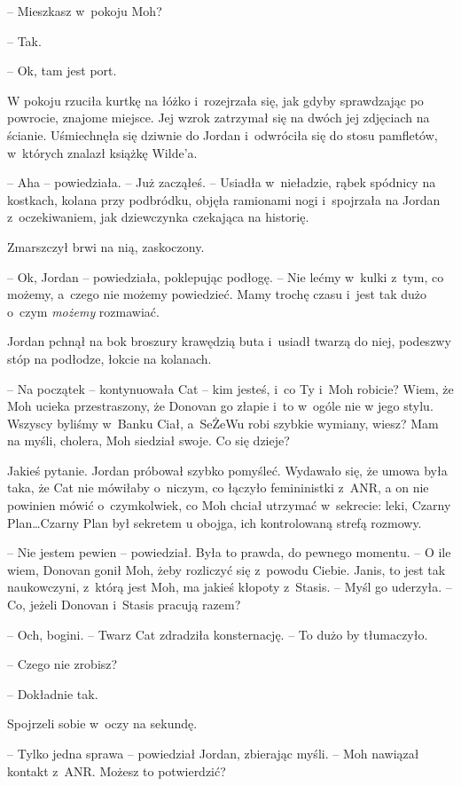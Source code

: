 \documentclass[oneside,polish,11pt,sfheadings]{mwbk}
\begin{document}
-- Mieszkasz w~pokoju Moh?

-- Tak.

-- Ok, tam jest port.

W pokoju rzuciła kurtkę na łóżko i~rozejrzała się, jak gdyby sprawdzając
po powrocie, znajome miejsce. Jej wzrok zatrzymał się na dwóch jej
zdjęciach na ścianie. Uśmiechnęła się dziwnie do Jordan i~odwróciła się
do stosu pamfletów, w~których znalazł książkę Wilde'a.

-- Aha -- powiedziała. -- Już zacząłeś. -- Usiadła w~nieładzie, rąbek
spódnicy na kostkach, kolana przy podbródku, objęła ramionami nogi i~spojrzała na Jordan z~oczekiwaniem, jak dziewczynka czekająca na
historię.

Zmarszczył brwi na nią, zaskoczony.

-- Ok, Jordan -- powiedziała, poklepując podłogę. -- Nie lećmy w~kulki z~tym, co możemy, a~czego nie możemy powiedzieć. Mamy trochę czasu i~jest
tak dużo o~czym \emph{możemy} rozmawiać.

Jordan pchnął na bok broszury krawędzią buta i~usiadł twarzą do niej,
podeszwy stóp na podłodze, łokcie na kolanach.

-- Na początek -- kontynuowała Cat -- kim jesteś, i~co Ty i~Moh robicie?
Wiem, że Moh ucieka przestraszony, że Donovan go złapie i~to w~ogóle nie
w jego stylu. Wszyscy byliśmy w~Banku Ciał, a~SeŻeWu robi szybkie
wymiany, wiesz? Mam na myśli, cholera, Moh siedział swoje. Co się
dzieje?

Jakieś pytanie. Jordan próbował szybko pomyśleć. Wydawało się, że umowa
była taka, że Cat nie mówiłaby o~niczym, co łączyło femininistki z~ANR,
a on nie powinien mówić o~czymkolwiek, co Moh chciał utrzymać w~sekrecie: leki, Czarny Plan\ldots Czarny Plan był sekretem u obojga, ich
kontrolowaną strefą rozmowy.

-- Nie jestem pewien -- powiedział. Była to prawda, do pewnego momentu. -- O ile wiem, Donovan gonił Moh, żeby rozliczyć się z~powodu Ciebie.
Janis, to jest tak naukowczyni, z~którą jest Moh, ma jakieś kłopoty z~Stasis. -- Myśl go uderzyła. -- Co, jeżeli Donovan i~Stasis pracują razem?

-- Och, bogini. -- Twarz Cat zdradziła konsternację. -- To dużo by
tłumaczyło.

-- Czego nie zrobisz?

-- Dokładnie tak.

Spojrzeli sobie w~oczy na sekundę.

-- Tylko jedna sprawa -- powiedział Jordan, zbierając myśli. -- Moh
nawiązał kontakt z~ANR. Możesz to potwierdzić?
\end{document}
